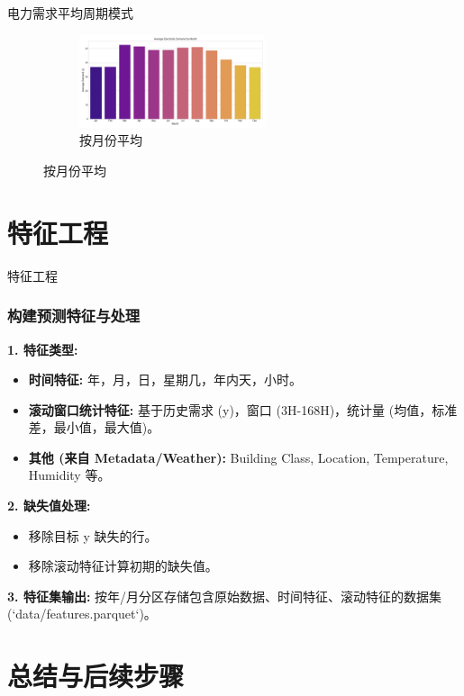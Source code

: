 \documentclass{beamer} %
\begin{document}
\begin{frame}{电力需求平均周期模式}
\begin{figure}[H]
        \begin{figure}
            \includegraphics[width=0.6\textwidth]{../plots/avg_demand_by_month_spark.png}
            \caption{按月份平均}
        \end{figure}
    \end{figure}
\end{frame}

\section{特征工程}
\begin{frame}{特征工程}
    \frametitle{构建预测特征与处理}
    \textbf{1. 特征类型:}
    \begin{itemize}
        \item \textbf{时间特征:} 年，月，日，星期几，年内天，小时。
        \item \textbf{滚动窗口统计特征:} 基于历史需求 (y)，窗口 (3H-168H)，统计量 (均值，标准差，最小值，最大值)。
        \item \textbf{其他 (来自 Metadata/Weather):} Building Class, Location, Temperature, Humidity 等。
    \end{itemize}

    \textbf{2. 缺失值处理:}
    \begin{itemize}
        \item 移除目标 y 缺失的行。
        \item 移除滚动特征计算初期的缺失值。
    \end{itemize}

    \textbf{3. 特征集输出:} 按年/月分区存储包含原始数据、时间特征、滚动特征的数据集 (`data/features.parquet`)。
\end{frame}


\section{总结与后续步骤}
\end{document}
